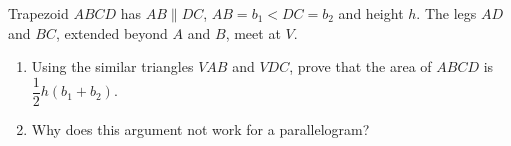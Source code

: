 Trapezoid $ABCD$ has $AB\parallel DC$, $AB=b_1<DC=b_2$ and height $h$. The legs $AD$ and $BC$, extended beyond $A$ and $B$, meet at $V$.
\begin{enumerate}
\item[(a)] Using the similar triangles $VAB$ and $VDC$, prove that the area of $ABCD$ is $\dfrac{1}{2}h(b_1+b_2)$.
\item[(b)] Why does this argument not work for a parallelogram?
\end{enumerate}
